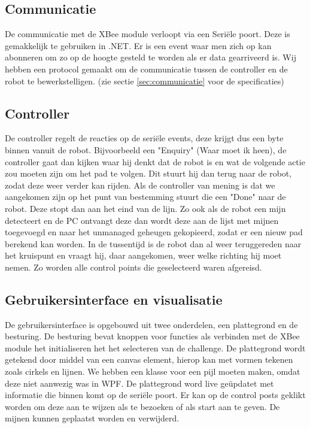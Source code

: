 \documentclass{report}
\begin{document}
\subsection{Communicatie}
De communicatie met de XBee module verloopt via een Seriële poort. Deze is gemakkelijk te gebruiken in .NET. Er is een event waar men zich op kan abonneren om zo op de hoogte gesteld te worden als er data gearriveerd is. Wij hebben een protocol gemaakt om de communicatie tussen de controller en de robot te bewerkstelligen. (zie sectie \ref{sec:communicatie} voor de specificaties)

\subsection{Controller}
De controller regelt de reacties op de seriële events, deze krijgt dus een byte binnen vanuit de robot. Bijvoorbeeld een "Enquiry" (Waar moet ik heen), de controller gaat dan kijken waar hij denkt dat de robot is en wat de volgende actie zou moeten zijn om het pad te volgen.
Dit stuurt hij dan terug naar de robot, zodat deze weer verder kan rijden.
Als de controller van mening is dat we aangekomen zijn op het punt van bestemming stuurt die een "Done" naar de robot. Deze stopt dan aan het eind van de lijn.
Zo ook als de robot een mijn detecteert en de PC ontvangt deze dan wordt deze aan de lijst met mijnen toegevoegd en naar het unmanaged geheugen gekopieerd, zodat er een nieuw pad berekend kan worden.
In de tussentijd is de robot dan al weer teruggereden naar het kruispunt en vraagt hij, daar aangekomen, weer welke richting hij moet nemen.
Zo worden alle control points die geselecteerd waren afgereisd.

\subsection{Gebruikersinterface en visualisatie}
De gebruikersinterface is opgebouwd uit twee onderdelen, een plattegrond en de besturing.
De besturing bevat knoppen voor functies als verbinden met de XBee module het initialiseren het het selecteren van de challenge.
De plattegrond wordt getekend door middel van een canvas element, hierop kan met vormen tekenen zoals cirkels en lijnen. We hebben een klasse voor een pijl moeten maken, omdat deze niet aanwezig was in WPF.
De plattegrond word live geüpdatet met informatie die binnen komt op de seriële poort.
Er kan op de control posts geklikt worden om deze aan te wijzen als te bezoeken of als start aan te geven.
De mijnen kunnen geplaatst worden en verwijderd.
\end{document}
